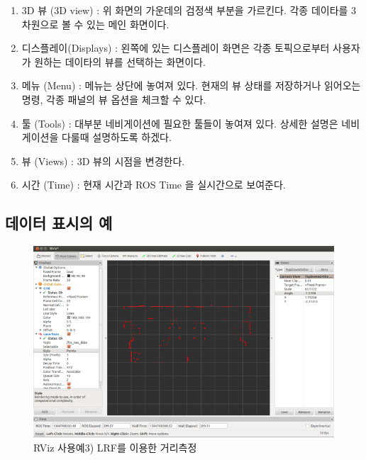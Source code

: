 \begin{enumerate}[leftmargin=*, label=\arabic{*})]
\item 3D 뷰 (3D view)
: 위 화면의 가운데의 검정색 부분을 가르킨다. 각종 데이타를 3차원으로 볼 수 있는 메인 화면이다.

\item 디스플레이(Displays) 
: 왼쪽에 있는 디스플레이 화면은 각종 토픽으로부터 사용자가 원하는 데이타의 뷰를 선택하는 화면이다.

\item 메뉴 (Menu)
: 메뉴는 상단에 놓여져 있다. 현재의 뷰 상태를 저장하거나 읽어오는 명령, 각종 패널의 뷰 옵션을 체크할 수 있다.

\item 툴 (Tools)
: 대부분 네비게이션에 필요한 툴들이 놓여져 있다. 상세한 설명은 네비게이션을 다룰때 설명하도록 하겠다.

\item 뷰 (Views)
: 3D 뷰의 시점을 변경한다.

\item 시간 (Time)
: 현재 시간과 ROS Time 을 실시간으로 보여준다.
\end{enumerate}


\subsection{데이터 표시의 예}

\begin{figure}[h]
\centering\includegraphics[width=0.7\columnwidth]{pictures/chapter6/rviz_example3.png}
\caption{RViz 사용예3) LRF를 이용한 거리측정}
\end{figure}

